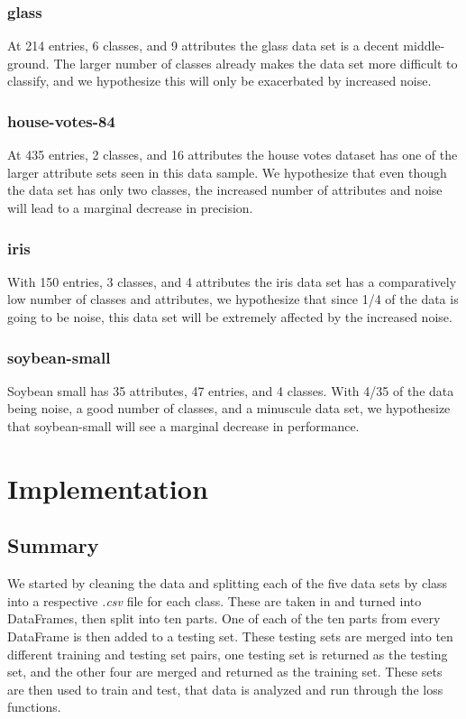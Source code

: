 \documentclass[twoside,11pt]{article}
\begin{document}
	\subsubsection{glass}\label{subsubsec:glass}
	At 214 entries, 6 classes, and 9 attributes the glass data set is a decent middle-ground. The larger number of classes already makes the data set more difficult to classify, and we hypothesize this will only be exacerbated by increased noise.
	
	\subsubsection{house-votes-84}\label{subsubsec:house-votes-84}
	At 435 entries, 2 classes, and 16 attributes the house votes dataset has one of the larger attribute sets seen in this data sample. We hypothesize that even though the data set has only two classes, the increased number of attributes and noise will lead to a marginal decrease in precision.
	
	\subsubsection{iris}\label{subsubsec:iris}
	With 150 entries, 3 classes, and 4 attributes the iris data set has a comparatively low number of classes and attributes, we hypothesize that since 1/4 of the data is going to be noise, this data set will be extremely affected by the increased noise.
	
	\subsubsection{soybean-small}\label{subsubsec:soybean-small}
	Soybean small has 35 attributes, 47 entries, and 4 classes. With 4/35 of the data being noise, a good number of classes, and a minuscule data set, we hypothesize that soybean-small will see a marginal decrease in performance.
	
	\section{Implementation}\label{sec:implementation}
	
	\subsection{Summary}\label{subsec:summary}
	We started by cleaning the data and splitting each of the five data sets by class into a respective \textit{.csv} file for each class. These are taken in and turned into DataFrames, then split into ten parts. One of each of the ten parts from every DataFrame is then added to a testing set. These testing sets are merged into ten different training and testing set pairs, one testing set is returned as the testing set, and the other four are merged and returned as the training set. These sets are then used to train and test, that data is analyzed and run through the loss functions.
	
\end{document}
